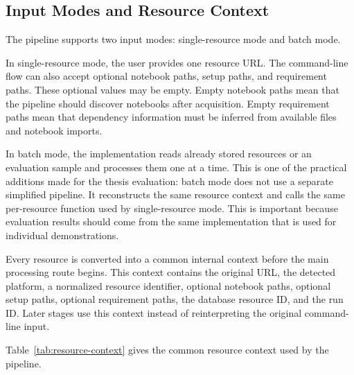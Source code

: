 \subsection{Input Modes and Resource Context}

The pipeline supports two input modes: single-resource mode and batch mode.

In single-resource mode, the user provides one resource URL. The command-line flow can also accept optional notebook paths, setup paths, and requirement paths. These optional values may be empty. Empty notebook paths mean that the pipeline should discover notebooks after acquisition. Empty requirement paths mean that dependency information must be inferred from available files and notebook imports.

In batch mode, the implementation reads already stored resources or an evaluation sample and processes them one at a time. This is one of the practical additions made for the thesis evaluation: batch mode does not use a separate simplified pipeline. It reconstructs the same resource context and calls the same per-resource function used by single-resource mode. This is important because evaluation results should come from the same implementation that is used for individual demonstrations.

Every resource is converted into a common internal context before the main processing route begins. This context contains the original URL, the detected platform, a normalized resource identifier, optional notebook paths, optional setup paths, optional requirement paths, the database resource ID, and the run ID. Later stages use this context instead of reinterpreting the original command-line input.

Table~\ref{tab:resource-context} gives the common resource context used by the pipeline.

